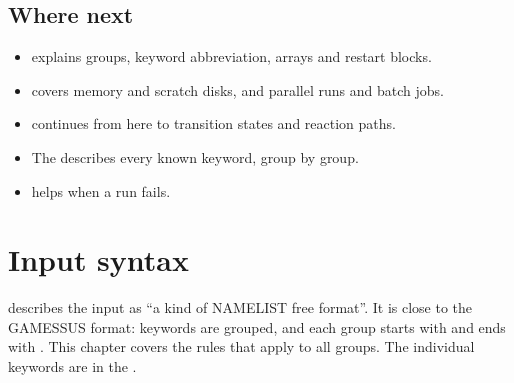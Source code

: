\documentclass[letterpaper,10pt,english,openany,oneside]{sphinxmanual}
\begin{document}
\section{Where next}
\label{\detokenize{start/getting-started:where-next}}\begin{itemize}
\item {} 
\sphinxAtStartPar
{\hyperref[\detokenize{start/input-syntax::doc}]{}} explains groups, keyword abbreviation, arrays and restart blocks.

\item {} 
\sphinxAtStartPar
{\hyperref[\detokenize{start/running::doc}]{}} covers memory and scratch disks, and {\hyperref[\detokenize{start/parallel::doc}]{}} parallel runs and batch jobs.

\item {} 
\sphinxAtStartPar
{\hyperref[\detokenize{tasks/ts-irc-scan::doc}]{}} continues from here to transition states and reaction paths.

\item {} 
\sphinxAtStartPar
The {\hyperref[\detokenize{reference/index::doc}]{}} describes every known keyword, group by group.

\item {} 
\sphinxAtStartPar
{\hyperref[\detokenize{troubleshooting/common-problems:troubleshooting-common-problems}]{}} helps when a run fails.

\end{itemize}

\sphinxstepscope


\chapter{Input syntax}
\label{\detokenize{start/input-syntax:input-syntax}}\label{\detokenize{start/input-syntax::doc}}
\sphinxAtStartPar
{} describes the input as “a kind of NAMELIST free format”. It is close to the GAMESS\sphinxhyphen{}US format: keywords are
grouped, and each group starts with  and ends with . This chapter covers the rules that apply to all
groups. The individual keywords are in the {\hyperref[\detokenize{reference/index::doc}]{}}.
\end{document}
